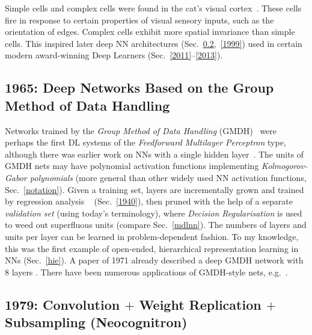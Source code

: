 \documentclass[letterpaper]{article}
\begin{document}
\begin{CJK*}{UTF8}{gbsn}
Simple cells and complex cells were found in the cat's 
visual cortex~\citep[e.g.,][]{Hubel:62,wiesel:1959}.
These cells fire in response to certain properties of visual sensory inputs, 
such as the orientation of edges. Complex cells exhibit more spatial invariance than simple cells.
This  inspired later deep NN architectures 
(Sec.~\ref{1979},~\ref{1999}) used in certain modern award-winning Deep Learners (Sec.~\ref{2011}--\ref{2013}).



\subsection{1965: Deep Networks Based on the Group Method of Data Handling}
\label{1965}

Networks trained by the {\em Group Method of Data Handling} (GMDH)~\citep{ivakhnenko1965,ivakhnenko1967,ivakhnenko1968,ivakhnenko1971} 
were perhaps the first DL systems of
the {\em Feedforward Multilayer Perceptron} type,
although there was earlier work on NNs with a single hidden layer~\citep[e.g.,][]{joseph1961,viglione1970}.
The units of GMDH nets may have polynomial activation functions implementing 
{\em Kol\-mo\-go\-rov-Gabor polynomials} (more general than other widely used NN activation functions, Sec.~\ref{notation}).
Given a training set, layers are incrementally grown and trained by regression analysis ~\citep[e.g.,][]{legendre1805,gauss1809,gauss1821} (Sec.~\ref{1940}), 
then pruned with the help of a
separate {\em validation set} (using today's terminology), where
{\em Decision Regularisation} is used to weed out 
superfluous units (compare Sec.~\ref{mdlnn}). The numbers of layers and units per layer can be learned in
problem-dependent fashion.
To my knowledge, this was the first example of open-ended, hierarchical 
representation learning  in NNs (Sec.~\ref{hie}).
A paper of 1971 already described a deep GMDH network with 8 layers
\citep{ivakhnenko1971}.
There have been numerous applications of GMDH-style nets, e.g.~\citep{ikeda1976,farlow1984,madala1994,ivakhnenko1995,kondo1998,kordik2003,witczak2006,kondo2008}. 


\subsection{1979:  Convolution $+$ Weight Replication $+$ Subsampling (Neocognitron)}
\label{1979}


\end{CJK*}
\end{document}
